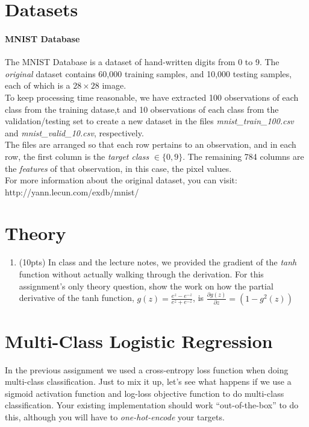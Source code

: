 \documentclass[12pt]{article}
\begin{document}
\newpage
\section*{Datasets}
\paragraph{MNIST Database } 
The MNIST Database is a dataset of hand-written digits from 0 to 9.  The \emph{original} dataset  contains 60,000 training samples, and 10,000 testing samples, each of which is a $28\times28$ image.\\

\noindent
To keep processing time reasonable, we have extracted 100 observations of each class from the training datase,t and 10 observations of each class from the validation/testing set to create a new dataset in the files \emph{mnist\_train\_100.csv} and \emph{mnist\_valid\_10.csv}, respectively.\\

\noindent
The files are arranged so that each row pertains to an observation, and in each row, the first column is the \emph{target class} $\in \{0,9\}$.  The remaining 784 columns are the \emph{features} of that observation, in this case, the pixel values.  \\

\noindent
For more information about the original dataset, you can visit:  http://yann.lecun.com/exdb/mnist/


\newpage
\section{Theory}
\begin{enumerate}
\item (10pts) In class and the lecture notes, we provided the gradient of the \emph{tanh} function without actually walking through the derivation.  For this assignment's only theory question, show the work on how the partial derivative of the tanh function, $g(z) = \frac{e^z-e^{-z}}{e^z+e^{-z}}$, is $\frac{\partial g(z)}{\partial z} = (1-g^2(z))$

\end{enumerate}
\newpage
\section{Multi-Class Logistic Regression}
In the previous assignment we used a cross-entropy loss function when doing multi-class classification.  Just to mix it up, let's see what happens if we use a sigmoid activation function and log-loss objective function to do multi-class classification.  Your existing implementation should work ``out-of-the-box'' to do this, although you will have to \emph{one-hot-encode} your targets.\\
\end{document}
